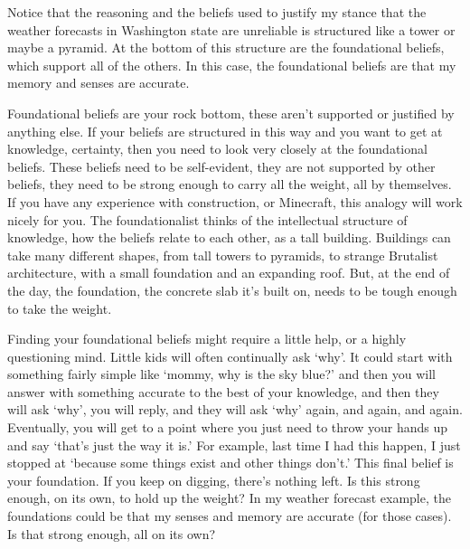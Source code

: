 
Notice that the reasoning and the beliefs used to justify my stance that the weather forecasts in Washington state are unreliable is structured like a tower or maybe a pyramid. At the bottom of this structure are the foundational beliefs, which support all of the others. In this case, the foundational beliefs are that my memory and senses are accurate. 

Foundational beliefs are your rock bottom, these aren't supported or justified by anything else. If your beliefs are structured in this way and you want to get at knowledge, certainty, then you need to look very closely at the foundational beliefs. These beliefs need to be self-evident, they are not  supported by other beliefs, they need to be strong enough to carry all the weight, all by themselves.  If you have any experience with construction, or Minecraft, this analogy will work nicely for you. The foundationalist thinks of the intellectual structure of knowledge, how the beliefs relate to each other, as a tall building. Buildings can take many different shapes, from tall towers to pyramids, to strange Brutalist architecture, with a small foundation and an expanding roof. But, at the end of the day, the foundation, the concrete slab it's built on, needs to be tough enough to take the weight. 

Finding your foundational beliefs might require a little help, or a highly questioning mind. Little kids will often continually ask `why'. It could start with something fairly simple like `mommy, why is the sky blue?' and then you will answer with something accurate to the best of your knowledge, and then they will ask `why', you will reply, and they will ask `why' again, and again, and again. Eventually, you will get to a point where you just need to throw your hands up and say `that's just the way it is.' For example, last time I had this happen, I just stopped at `because some things exist and other things don't.' This final belief is your foundation. If you keep on digging, there's nothing left. Is this strong enough, on its own, to hold up the weight? In my weather forecast example, the foundations could be that my senses and memory are accurate (for those cases). Is that strong enough, all on its own? 

